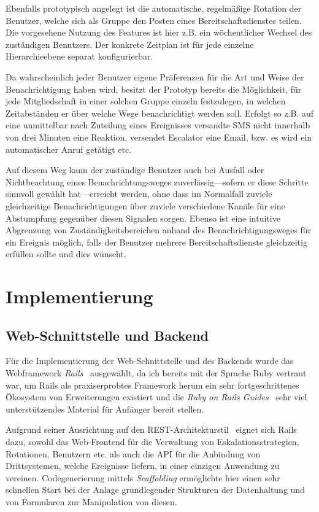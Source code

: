 \documentclass[11pt,utf8,notoc,bibnum,german,final]{zihpub}
\begin{document}
Ebenfalls prototypisch angelegt ist die automatische, regelmäßige Rotation der
Benutzer, welche sich als Gruppe den Posten eines Bereitschaftsdienstes teilen.
Die vorgesehene Nutzung des Features ist hier z.B. ein wöchentlicher Wechsel
des zuständigen Benutzers. Der konkrete Zeitplan ist für jede einzelne
Hierarchieebene separat konfigurierbar.

Da wahrscheinlich jeder Benutzer eigene Präferenzen für die Art und Weise der
Benachrichtigung haben wird, besitzt der Prototyp bereits die Möglichkeit, für
jede Mitgliedschaft in einer solchen Gruppe einzeln festzulegen, in welchen
Zeitabständen er über welche Wege benachrichtigt werden soll. Erfolgt so z.B.
auf eine unmittelbar nach Zuteilung eines Ereignisses versandte SMS nicht
innerhalb von drei Minuten eine Reaktion, versendet Escalator eine Email, bzw.
es wird ein automatischer Anruf getätigt etc.

Auf diesem Weg kann der zuständige Benutzer auch bei Ausfall oder
Nichtbeachtung eines Benachrichtungsweges zuverlässig—sofern er diese Schritte
sinnvoll gewählt hat—erreicht werden, ohne dass im Normalfall zuviele
gleichzeitige Benachrichtigungen über zuviele verschiedene Kanäle für eine
Abstumpfung gegenüber diesen Signalen sorgen. Ebenso ist eine intuitive
Abgrenzung von Zuständigkeitsbereichen anhand des Benachrichtigungsweges für
ein Ereignis möglich, falls der Benutzer mehrere Bereitschaftsdienste
gleichzeitig erfüllen sollte und dies wünscht.

\section{Implementierung}

\subsection{Web-Schnittstelle und Backend}

Für die Implementierung der Web-Schnittstelle und des Backends wurde das
Webframework \emph{Rails}~\cite{rails} ausgewählt, da ich bereits mit der Sprache
Ruby vertraut war, um Rails als praxiserprobtes Framework herum ein sehr
fortgeschrittenes Ökosystem von Erweiterungen existiert und die \emph{Ruby on Rails
Guides}~\cite{rails-guides} sehr viel unterstützendes Material für Anfänger
bereit stellen.

Aufgrund seiner Ausrichtung auf den REST-Architekturstil~\cite{fielding-rest}
eignet sich Rails dazu, sowohl das Web-Frontend für die Verwaltung von
Eskalationsstrategien, Rotationen, Benutzern etc. als auch die API für die
Anbindung von Drittsystemen, welche Ereignisse liefern, in einer einzigen
Anwendung zu vereinen. Codegenerierung mittels \emph{Scaffolding} ermöglichte
hier einen sehr schnellen Start bei der Anlage grundlegender Strukturen der
Datenhaltung und von Formularen zur Manipulation von diesen.
\end{document}
